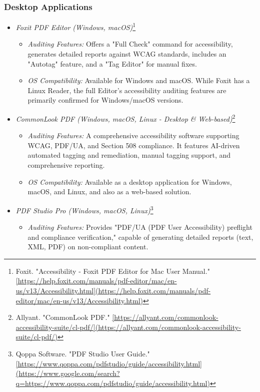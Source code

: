 \subsubsection{Desktop Applications}
\label{subsubsec:desktop-apps}
\begin{itemize}
\item \emph{Foxit PDF Editor (Windows, macOS)}\footnote{Foxit. "Accessibility - Foxit PDF Editor for Mac User Manual." \url{[https://help.foxit.com/manuals/pdf-editor/mac/en-us/v13/Accessibility.html](https://help.foxit.com/manuals/pdf-editor/mac/en-us/v13/Accessibility.html)}}
\begin{itemize}
\item \emph{Auditing Features:} Offers a "Full Check" command for accessibility, generates detailed reports against WCAG standards, includes an "Autotag" feature, and a "Tag Editor" for manual fixes.
\item \emph{OS Compatibility:} Available for Windows and macOS. While Foxit has a Linux Reader, the full Editor's accessibility auditing features are primarily confirmed for Windows/macOS versions.
\end{itemize}
\item \emph{CommonLook PDF (Windows, macOS, Linux - Desktop \& Web-based)}\footnote{Allyant. "CommonLook PDF." \url{[https://allyant.com/commonlook-accessibility-suite/cl-pdf/](https://allyant.com/commonlook-accessibility-suite/cl-pdf/)}}
\begin{itemize}
\item \emph{Auditing Features:} A comprehensive accessibility software supporting WCAG, PDF/UA, and Section 508 compliance. It features AI-driven automated tagging and remediation, manual tagging support, and comprehensive reporting.
\item \emph{OS Compatibility:} Available as a desktop application for Windows, macOS, and Linux, and also as a web-based solution.
\end{itemize}
\item \emph{PDF Studio Pro (Windows, macOS, Linux)}\footnote{Qoppa Software. "PDF Studio User Guide." \url{[https://www.qoppa.com/pdfstudio/guide/accessibility.html](https://www.google.com/search?q=https://www.qoppa.com/pdfstudio/guide/accessibility.html)}}
\begin{itemize}
\item \emph{Auditing Features:} Provides "PDF/UA (PDF User Accessibility) preflight and compliance verification," capable of generating detailed reports (text, XML, PDF) on non-compliant content.

\end{itemize}
\end{itemize}
